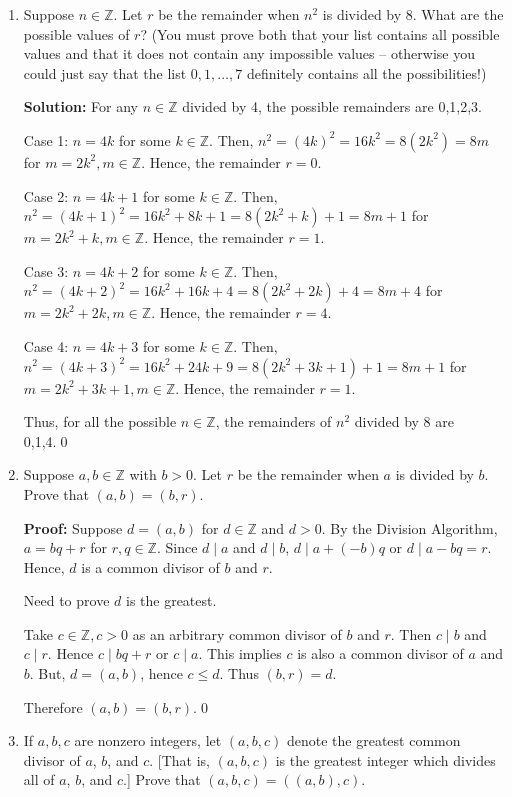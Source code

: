 \documentclass[12pt,reqno]{article}
\newcommand{\Z}{\mathbb{Z}}
\begin{document}
\begin{enumerate}
\item Suppose $n\in\Z$. Let $r$ be the remainder when $n^2$ is divided by 8. What are the possible values of $r$? (You must prove both that your list contains all possible values and that it does not contain any impossible values -- otherwise you could just say that the list $0, 1, \dotsc, 7$ definitely contains all the possibilities!)

\textbf{Solution: }For any $n\in\Z$ divided by 4, the possible remainders are 0,1,2,3. 

Case 1: $n = 4k$ for some $k\in\Z$. Then, $n^2 = (4k)^2 = 16k^2 = 8(2k^2) = 8m$ for $m = 2k^2, m\in\Z$. Hence, the remainder $r=0$.

Case 2: $n = 4k+1$ for some $k\in\Z$. Then, $n^2 = (4k+1)^2 = 16k^2 + 8k + 1 = 8(2k^2 + k) + 1 = 8m + 1$ for $m=2k^2+k, m\in\Z$. Hence, the remainder $r=1$.

Case 3: $n = 4k+2$ for some $k\in\Z$. Then, $n^2 = (4k+2)^2 = 16k^2 + 16k + 4 = 8(2k^2 + 2k) + 4 = 8m + 4$ for $m=2k^2+2k, m\in\Z$. Hence, the remainder $r=4$.

Case 4: $n = 4k+3$ for some $k\in\Z$. Then, $n^2 = (4k+3)^2 = 16k^2 + 24k + 9 = 8(2k^2 + 3k +1) + 1 = 8m + 1$ for $m=2k^2+3k+1, m\in\Z$. Hence, the remainder $r=1$.

Thus, for all the possible $n\in\Z$, the remainders of $n^2$ divided by 8 are 0,1,4.\qed

\item Suppose $a,b \in \Z$ with $b>0$. Let $r$ be the remainder when $a$ is divided by $b$. Prove that $(a,b)=(b,r)$.

\textbf{Proof: }Suppose $d = (a,b)$ for $d\in\Z$ and $d>0$. By the Division Algorithm,$a = bq + r$ for $r,q \in\Z$. Since $d \mid a$ and $d \mid b$, $d \mid a+(-b)q$ or $d \mid a-bq=r$. Hence, $d$ is a common divisor of $b$ and $r$. 

Need to prove $d$ is the greatest.

Take $c\in\Z, c>0$ as an arbitrary common divisor of $b$ and $r$. Then $c \mid b$ and $c \mid r$. Hence $c\mid bq+r$ or $c\mid a$. This implies $c$ is also a common divisor of $a$ and $b$. But, $d=(a,b)$, hence $c\leq d$. Thus $(b,r)=d$.

Therefore $(a,b)=(b,r)$.\qed

\item If $a,b,c$ are nonzero integers, let $(a,b,c)$ denote the greatest common divisor of $a$, $b$, and $c$. [That is, $(a,b,c)$ is the greatest integer which divides all of $a$, $b$, and $c$.] Prove that $(a,b,c)=((a,b),c)$. 


\end{enumerate}
\end{document}
